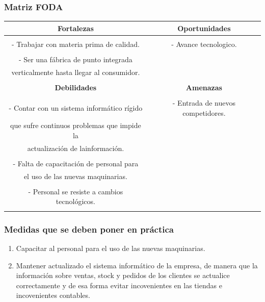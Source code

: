 \documentclass[a4paper,10pt,titlepage]{article}
\begin{document}
\subsubsection{Matriz FODA}
  \begin{tabular}{|c|c|}
    \hline 
      \textbf{Fortalezas} & \textbf{Oportunidades} \\ \hline
& \\
- Trabajar con materia prima de calidad. 
& - Avance tecnologico.\\
&\\
- Ser una f\'abrica de punto integrada & \\verticalmente hasta llegar al consumidor. &\\ &\\

\hline 
    \textbf{Debilidades} & \textbf{Amenazas} \\
\hline     
&\\
- Contar con un sistema inform\'atico r\'igido& - Entrada de nuevos competidores. \\que sufre continuos problemas que impide la &\\ actualizaci\'on de lainformaci\'on. &\\
&\\
- Falta de capacitaci\'on de personal para &\\el uso de las nuevas maquinarias. &\\
&\\
- Personal se resiste a cambios tecnol\'ogicos. &\\&\\ 
 \hline    
  \end{tabular}

  
\subsubsection{Medidas que se deben poner en pr\'actica}
 \begin{enumerate}
 \item Capacitar al personal para el uso de las nuevas maquinarias.
 \item Mantener actualizado el sistema inform\'atico de la empresa, de manera que la informaci\'on sobre ventas, stock y pedidos de los clientes se actualice correctamente 
y de esa forma evitar incovenientes en las tiendas e incovenientes contables.
\end{enumerate} 


\end{document}
